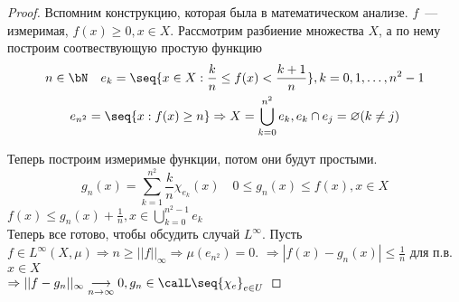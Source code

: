 \documentclass[document]{subfiles}
\begin{document}
\begin{proof}
    Вспомним конструкцию, которая была в математическом анализе. $f$~--- измеримая, $f(x) \geq 0, x \in X$.
    Рассмотрим разбиение множества $X$, а по нему построим соотвествующую простую функцию
    \begin{gather*}
        n \in \bN \quad e_k = \seq{x \in X: \frac{k}{n} \leq f(x) < \frac{k+1}{n}}, k = 0, 1, \ldots, n^2 - 1 \\
        e_{n^2} = \seq{x: f(x) \geq n} \Rightarrow X = \bigcup^{n^2}_{k=0} e_k, e_k \cap e_j = \varnothing (k \ne j)
    \end{gather*}

    Теперь построим измеримые функции, потом они будут простыми.
    \[g_n(x) = \sum^{n^2}_{k=1} \frac{k}{n} \chi_{e_k}(x) \quad 0 \leq g_n(x) \leq f(x), x \in X \]
    $f(x) \leq g_n(x) + \frac{1}{n}, x \in \bigcup^{n^2-1}_{k=0} e_k$ \\

    Теперь все готово, чтобы обсудить случай $L^\infty$. Пусть $f \in L^\infty(X,\mu) \Rightarrow n \geq ||f||_\infty \Rightarrow \mu(e_{n^2}) = 0 $.
    $\Rightarrow |f(x) - g_n(x)| \leq \frac{1}{n}$ для п.в. $x \in X$ \\
    $\Rightarrow ||f-g_n||_\infty \underset{n \to \infty}{\longrightarrow} 0, g_n \in \calL \seq{\chi_e}_{e \in U}$


\end{proof}
\end{document}
